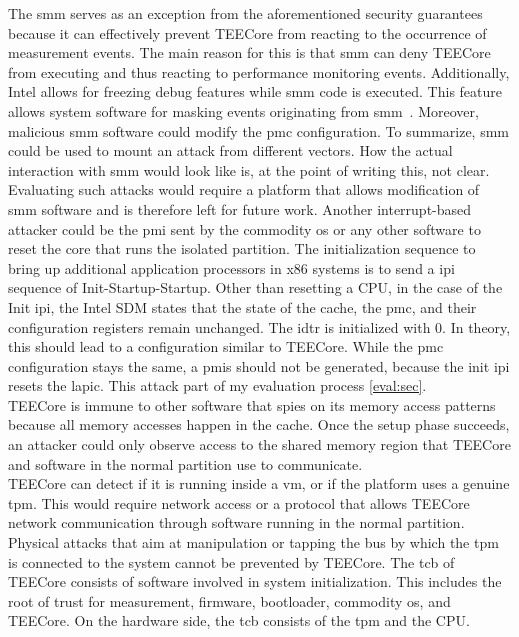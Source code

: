 The \gls{smm} serves as an exception from the aforementioned security guarantees
because it can effectively prevent TEECore from reacting to the occurrence of
measurement events. The main reason for this is that \gls{smm} can deny TEECore
from executing and thus reacting to performance monitoring events. Additionally,
Intel allows for freezing debug features while \gls{smm} code is executed. This
feature allows system software for masking events originating from
\gls{smm}~\cite{intel_sdm}. Moreover, malicious \gls{smm} software could modify
the \gls{pmc} configuration. To summarize, \gls{smm} could be used to mount an
attack from different vectors. How the actual interaction with \gls{smm} would
look like is, at the point of writing this, not clear. Evaluating such attacks
would require a platform that allows modification of \gls{smm} software and is
therefore left for future work. Another interrupt-based attacker could be the
\gls{pmi} sent by the commodity \gls{os} or any other software to reset the core
that runs the isolated partition. The initialization sequence to bring up
additional application processors in x86 systems is to send a \gls{ipi} sequence
of Init-Startup-Startup. Other than resetting a CPU, in the case of the Init
\gls{ipi}, the Intel SDM states that the state of the cache, the \gls{pmc}, and
their configuration registers remain unchanged. The \gls{idtr} is initialized
with 0. In theory, this should lead to a configuration similar to TEECore. While
the \gls{pmc} configuration stays the same, a \glspl{pmi} should not be
generated, because the init \gls{ipi} resets the \gls{lapic}. This attack part
of my evaluation process \ref{eval:sec}.\\

TEECore is immune to other software that spies on its memory access patterns
because all memory accesses happen in the cache. Once the setup phase succeeds,
an attacker could only observe access to the shared memory region that TEECore
and software in the normal partition use to communicate.\\

TEECore can detect if it is running inside a \gls{vm}, or if the
platform uses a genuine \gls{tpm}. This would require network access or a
protocol that allows TEECore network communication through software running in
the normal partition. Physical attacks that aim at manipulation or tapping the
bus by which the \gls{tpm} is connected to the system cannot be prevented
by TEECore. The \gls{tcb} of TEECore consists of software involved in
system initialization. This includes the root of trust for measurement,
firmware, bootloader, commodity \gls{os}, and TEECore. On the hardware side, the
\gls{tcb} consists of the \gls{tpm} and the CPU.

